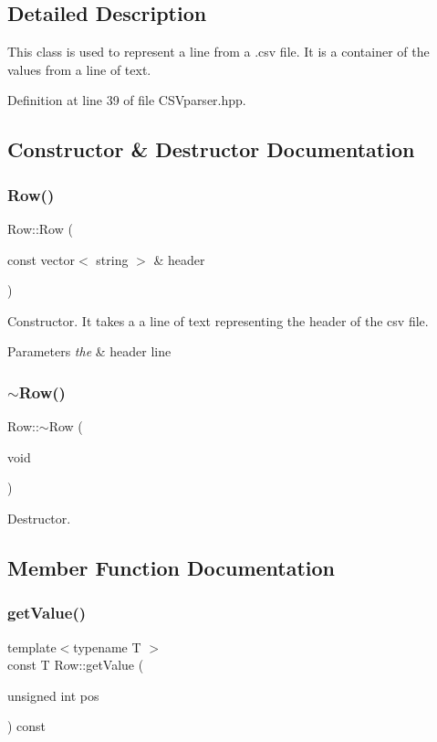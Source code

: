 \subsection{Detailed Description}
This class is used to represent a line from a .csv file. It is a container of the values from a line of text. 

Definition at line 39 of file C\+S\+Vparser.\+hpp.



\subsection{Constructor \& Destructor Documentation}
\mbox{\label{class_row_afc5afcd4b8560ddd3b7372df2bc063a8}} 
\subsubsection{Row()}
{\footnotesize\ttfamily Row\+::\+Row (\begin{DoxyParamCaption}\item[{const vector$<$ string $>$ \&}]{header }\end{DoxyParamCaption})}

Constructor. It takes a a line of text representing the header of the csv file. 
\begin{DoxyParams}{Parameters}
{\em the} & header line \\
\hline
\end{DoxyParams}
\mbox{\label{class_row_a671be9f718722eccb2d3121f1579733e}} 
\subsubsection{$\sim$Row()}
{\footnotesize\ttfamily Row\+::$\sim$\+Row (\begin{DoxyParamCaption}\item[{void}]{ }\end{DoxyParamCaption})}

Destructor. 

\subsection{Member Function Documentation}
\mbox{\label{class_row_a06931bff452df5a451da2268423bb6ea}} 
\subsubsection{getValue()}
{\footnotesize\ttfamily template$<$typename T $>$ \\
const T Row\+::get\+Value (\begin{DoxyParamCaption}\item[{unsigned int}]{pos }\end{DoxyParamCaption}) const\hspace{0.3cm}{\ttfamily [inline]}}

